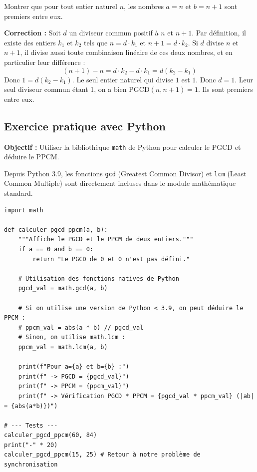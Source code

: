 \begin{exemple}
Montrer que pour tout entier naturel $n$, les nombres $a = n$ et $b = n+1$ sont premiers entre eux.
\end{exemple}

\textbf{Correction :} Soit $d$ un diviseur commun positif à $n$ et $n+1$. 
Par définition, il existe des entiers $k_1$ et $k_2$ tels que $n = d \cdot k_1$ et $n+1 = d \cdot k_2$.
Si $d$ divise $n$ et $n+1$, il divise aussi toute combinaison linéaire de ces deux nombres, et en particulier leur différence :
$$(n+1) - n = d \cdot k_2 - d \cdot k_1 = d(k_2 - k_1)$$
Donc $1 = d(k_2 - k_1)$. Le seul entier naturel qui divise $1$ est $1$. Donc $d = 1$.
Leur seul diviseur commun étant 1, on a bien $\text{PGCD}(n, n+1) = 1$. Ils sont premiers entre eux.

\subsection{Exercice pratique avec Python}

\textbf{Objectif :} Utiliser la bibliothèque \texttt{math} de Python pour calculer le PGCD et déduire le PPCM.

Depuis Python 3.9, les fonctions \texttt{gcd} (Greatest Common Divisor) et \texttt{lcm} (Least Common Multiple) sont directement incluses dans le module mathématique standard.

\begin{verbatim}
import math

def calculer_pgcd_ppcm(a, b):
    """Affiche le PGCD et le PPCM de deux entiers."""
    if a == 0 and b == 0:
        return "Le PGCD de 0 et 0 n'est pas défini."
        
    # Utilisation des fonctions natives de Python
    pgcd_val = math.gcd(a, b)
    
    # Si on utilise une version de Python < 3.9, on peut déduire le PPCM :
    # ppcm_val = abs(a * b) // pgcd_val
    # Sinon, on utilise math.lcm :
    ppcm_val = math.lcm(a, b)
    
    print(f"Pour a={a} et b={b} :")
    print(f" -> PGCD = {pgcd_val}")
    print(f" -> PPCM = {ppcm_val}")
    print(f" -> Vérification PGCD * PPCM = {pgcd_val * ppcm_val} (|ab| = {abs(a*b)})")

# --- Tests ---
calculer_pgcd_ppcm(60, 84)
print("-" * 20)
calculer_pgcd_ppcm(15, 25) # Retour à notre problème de synchronisation
\end{verbatim}